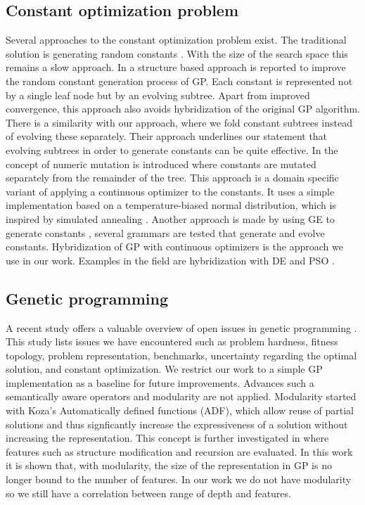 \subsection{Constant optimization problem}
Several approaches to the constant optimization problem exist. The traditional solution is generating random constants \citep{GP}. With the size of the search space this remains a slow approach.
In \citep{GPConstAlter} a structure based approach is reported to improve the random constant generation process of GP. Each constant is represented not by a single leaf node but by an evolving subtree. Apart from improved convergence, this approach also avoids hybridization of the original GP algorithm. There is a similarity with our approach, where we fold constant subtrees instead of evolving these separately. Their approach underlines our statement that evolving subtrees in order to generate constants can be quite effective. 
In \citep{GPConst} the concept of numeric mutation is introduced where constants are mutated separately from the remainder of the tree. This approach is a domain specific variant of applying a continuous optimizer to the constants. It uses a simple implementation based on a temperature-biased normal distribution, which is inspired by simulated annealing \citep{SA}.
Another approach is made by using GE to generate constants \citep{GPConstGE}, several grammars are tested that generate and evolve constants.
Hybridization of GP with continuous optimizers is the approach we use in our work. Examples in the field are hybridization with DE \citep{GPDE} and PSO \citep{SRBaseline}.


\subsection{Genetic programming}
A recent study offers a valuable overview of open issues in genetic programming \citep{GPIssues}. This study lists issues we have encountered such as problem hardness, fitness topology, problem representation, benchmarks, uncertainty regarding the optimal solution, and constant optimization.
We restrict our work to a simple GP implementation as a baseline for future improvements. Advances such a semantically aware operators \citep {GPSemantics} and modularity are not applied. Modularity started with Koza's \cite{GP} Automatically defined functions (ADF), which allow reuse of partial solutions and thus signficantly increase the expressiveness of a solution without increasing the representation. This concept is further investigated in \citep{GPModularity} where features such as structure modification and recursion are evaluated. In this work it is shown that, with modularity, the size of the representation in GP is no longer bound to the number of features. In our work we do not have modularity so we still have a correlation between range of depth and features.
\citep{GE}
\citep{GEDE}


